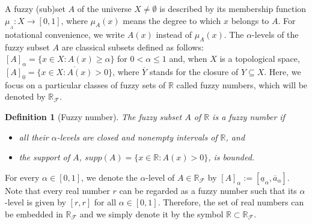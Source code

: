 \documentclass[12pt,a4paper]{article}
\newcommand{\RR}{\mathbb{R}}
\newcommand{\RF}{\mathbb{R}_\mathcal{F}}
\newtheorem{definition}{Definition}
\begin{document}
A fuzzy (sub)set $A$ of the universe $X\neq\emptyset$ is described by its membership function 
$\mu_{_A}:X\longrightarrow [0,1]$, where $\mu_{A}(x)$ means the degree to which $x$ belongs to $A$. For notational convenience, we write $A(x)$ instead of $\mu_A(x)$. %
The $\alpha$-levels of the fuzzy subset $A$ are classical subsets defined as follows: 
	$[A]_{\alpha}=\{x\in X:
A(x)\geq \alpha \}$ for  $0<\alpha\leq 1$ and, when $X$ is a topological space, 
$[A]_0=\overline{\{x\in X:A(x)>0\}}$, where $\overline{Y}$ stands for the closure of $Y \subseteq X$.
Here, we focus on a particular classes of fuzzy sets of $\RR$ called fuzzy numbers, which will be denoted by $\RF$.

\begin{definition}[Fuzzy number] \cite{de2017first,esmi2021solutions} %
The fuzzy subset $A$ of $\mathbb{R}$ is a  fuzzy number if 
	\begin{itemize}
		\item [i.] all their $\alpha$-levels are closed and nonempty intervals of $\mathbb{R}$, and
		\item[ii.] the support of $A$, $supp(A)=\{x\in \mathbb{R}:A(x)>0\}$, is bounded.
	\end{itemize}
\end{definition}

For every %
$\alpha \in [0,1]$, we denote the $\alpha$-level of $A \in \RF$  by $[A]_{\alpha} := [\underline{a}_\alpha, \overline{a}_\alpha]$. 
Note that every real number $r$ can be regarded as a fuzzy number such that its $\alpha$-level is given by $[r,r]$ for all $\alpha \in [0,1].$ Therefore, the set of real numbers can be embedded in $\RF$ and we simply denote it by the symbol $\RR \subset \RF$. 


\end{document}
